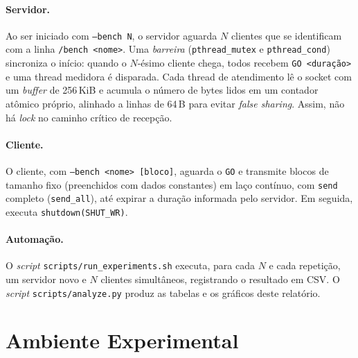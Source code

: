\documentclass[12pt,a4paper]{article}
\newcommand{\SI}[2]{\mbox{#1\,#2}}
\begin{document}
\paragraph{Servidor.} Ao ser iniciado com \texttt{--bench N}, o servidor aguarda
$N$ clientes que se identificam com a linha \texttt{/bench <nome>}. Uma
\textit{barreira} (\texttt{pthread\_mutex} e \texttt{pthread\_cond}) sincroniza o
início: quando o $N$-ésimo cliente chega, todos recebem
\texttt{GO <duração>} e uma thread medidora é disparada. Cada thread de
atendimento lê o socket com um \textit{buffer} de \SI{256}{KiB} e acumula o
número de bytes lidos em um contador atômico próprio, alinhado a linhas de
\SI{64}{B} para evitar \textit{false sharing}. Assim, não há \textit{lock} no
caminho crítico de recepção.

\paragraph{Cliente.} O cliente, com \texttt{--bench <nome> [bloco]}, aguarda o
\texttt{GO} e transmite blocos de tamanho fixo (preenchidos com dados
constantes) em laço contínuo, com \texttt{send} completo (\texttt{send\_all}),
até expirar a duração informada pelo servidor. Em seguida, executa
\texttt{shutdown(SHUT\_WR)}.

\paragraph{Automação.} O \textit{script} \texttt{scripts/run\_experiments.sh} executa,
para cada $N$ e cada repetição, um servidor novo e $N$ clientes simultâneos,
registrando o resultado em CSV. O \textit{script} \texttt{scripts/analyze.py} produz as
tabelas e os gráficos deste relatório.

\section{Ambiente Experimental}
\end{document}
